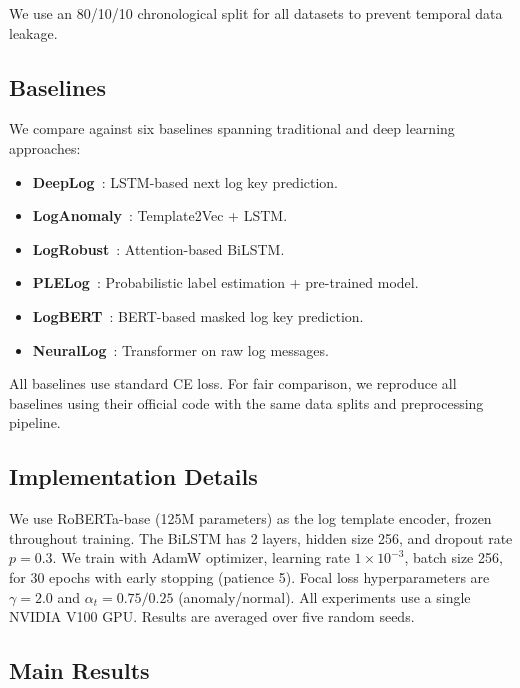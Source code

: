 \documentclass[conference]{IEEEtran}
\begin{document}
We use an 80/10/10 chronological split for all datasets to prevent temporal data leakage.

\subsection{Baselines}\label{sec:baselines}

We compare against six baselines spanning traditional and deep learning approaches:

\begin{itemize}
    \item \textbf{DeepLog}~\cite{du2017deeplog}: LSTM-based next log key prediction.
    \item \textbf{LogAnomaly}~\cite{meng2019loganomaly}: Template2Vec + LSTM.
    \item \textbf{LogRobust}~\cite{zhang2019robust}: Attention-based BiLSTM.
    \item \textbf{PLELog}~\cite{yang2021plelog}: Probabilistic label estimation + pre-trained model.
    \item \textbf{LogBERT}~\cite{guo2021logbert}: BERT-based masked log key prediction.
    \item \textbf{NeuralLog}~\cite{le2021neurallog}: Transformer on raw log messages.
\end{itemize}

All baselines use standard CE loss. For fair comparison, we reproduce all baselines using their official code with the same data splits and preprocessing pipeline.

\subsection{Implementation Details}\label{sec:impl}

We use RoBERTa-base (125M parameters) as the log template encoder, frozen throughout training.
The BiLSTM has 2 layers, hidden size 256, and dropout rate $p = 0.3$.
We train with AdamW optimizer, learning rate $1 \times 10^{-3}$, batch size 256,
for 30 epochs with early stopping (patience 5).
Focal loss hyperparameters are $\gamma = 2.0$ and $\alpha_t = 0.75/0.25$ (anomaly/normal).
All experiments use a single NVIDIA V100 GPU.
Results are averaged over five random seeds.

\subsection{Main Results}\label{sec:main_results}
\end{document}
